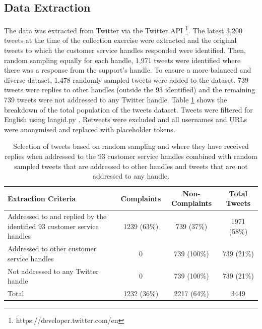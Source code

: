 \subsection{Data Extraction}
The data was extracted from Twitter via the Twitter API \footnote{https://developer.twitter.com/en}. The latest 3,200 tweets at the time of the collection exercise were extracted and the original tweets to which the customer service handles responded were identified. Then, random sampling equally for each handle, 1,971 tweets were identified where there was a response from the support's handle. To ensure a more balanced and diverse dataset, 1,478 randomly sampled tweets were added to the dataset. 739 tweets were replies to other handles (outside the 93 identified) and the remaining 739 tweets were not addressed to any Twitter handle. Table \ref{tab: tweet_counts} shows the breakdown of the total population of the tweets dataset. Tweets were filtered for English using langid.py \cite{luiLangidPyOfftheshelf2012}. Retweets were excluded and all usernames and URLs were anonymised and replaced with placeholder tokens.
\begin{table}[ht]
    \captionsetup{font=small}
    \centering
    \begin{tabularx}{\textwidth}{|X|c|c|c|}
        \hline
        \rowcolor[gray]{0.7}
        \textbf{Extraction Criteria} & \textbf{Complaints} & \textbf{Non-Complaints} & \textbf{Total Tweets} \\
        \hline
        Addressed to and replied by the identified 93 customer service handles & 1239 \small{(63\%)}  & 739 \small{(37\%)}  & 1971 \small{(58\%)}  \\
        \hline
        Addressed to other customer service handles & 0 & 739 \small{(100\%)} & 739 \small{(21\%)}  \\
        \hline
        Not addressed to any Twitter handle & 0 & 739 \small{(100\%)} & 739 \small{(21\%)}  \\
        \hline    
        \rowcolor[gray]{0.9}
        Total & 1232 \small{(36\%)}  & 2217 \small{(64\%)}  & 3449 \\
        \hline
    \end{tabularx}
    \caption{Selection of tweets based on random sampling and where they have received replies when addressed to the 93 customer service handles combined with random sampled tweets that are addressed to other handles and tweets that are not addressed to any handle.}    
    \label{tab: tweet_counts}
\end{table}  


